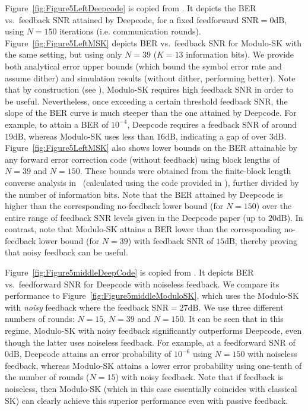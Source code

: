 \documentclass[article,onecolumn,11pt]{IEEEtran}
\newcommand{\dB}{\mathrm{dB}}
\newcommand{\snr}{\mathrm{SNR}}
\begin{document}
Figure~\ref{fig:Figure5LeftDeepcode} is copied from \cite[Figure~5 (Left)]{kim2018deepcode}. It depicts the BER 
vs.~feedback $\snr$ attained by Deepcode, for a fixed feedforward $\snr=0\dB$, using $N=150$  iterations (i.e. communication rounds). Figure~\ref{fig:Figure5LeftMSK} depicts BER vs.~feedback $\snr$ for Modulo-SK with the same setting, but using only $N=39$ ($K=13$ information bits). We provide both analytical error upper bounds (which bound the symbol error rate and assume dither) and simulation results (without dither, performing better). Note that by construction (see \cite{ben2017interactive}), Modulo-SK requires high feedback $\snr$ in order to be useful. Nevertheless, once exceeding a certain threshold feedback $\snr$, the slope of the BER curve is much steeper than the one attained by Deepcode. For example, to attain a BER of $10^{-4}$, Deepcode requires a feedback $\snr$ of around $19\dB$, whereas Modulo-SK uses less than $16\dB$, indicating a gap of over $3\dB$. Figure~\ref{fig:Figure5LeftMSK} also shows lower bounds on the BER attainable by any forward error correction code (without feedback) using block lengths of $N=39$ and $N=150$. These bounds were obtained from the finite-block length converse analysis in~\cite{YuryFinite} (calculated using the code provided in \cite{spectre}), further divided by the number of information bits. Note that the BER attained by Deepcode is higher than the corresponding no-feedback lower bound (for $N=150$) over the entire range of feedback $\snr$ levels given in the Deepcode paper (up to $20\dB$). In contrast, note that Modulo-SK attains a BER lower than the corresponding no-feedback lower bound (for $N=39$) with feedback $\snr$ of $15\dB$, thereby proving that noisy feedback can be useful.

Figure~\ref{fig:Figure5middleDeepCode} is copied from \cite[Figure~5 (Middle)]{kim2018deepcode}. It depicts BER vs.~feedforward $\snr$ for Deepcode with noiseless feedback. We compare its performance to Figure~\ref{fig:Figure5middleModuloSK}, which uses the Modulo-SK with \textit{noisy} feedback where the feedback $\snr = 27\dB$. We use three different numbers of rounds: $N = 15$, $N = 39$ and $N = 150$. It can be seen that in this regime, Modulo-SK with noisy feedback significantly outperforms Deepcode, even though the latter uses noiseless feedback. 
For example, at a feedforward $\snr$ of $0\dB$, Deepcode attains an error probability of $10^{-6}$ using $N=150$ with noiseless feedback, whereas Modulo-SK attains a lower error probability using one-tenth of the number of rounds ($N=15$) with noisy feedback. Note that if feedback is noiseless, then Modulo-SK (which in this case essentially coincides with classical SK) can clearly achieve this superior performance even with passive feedback. 
\end{document}
